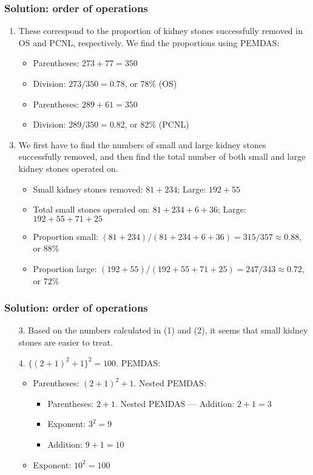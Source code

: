 \documentclass[11pt,dvipsnames]{beamer}
\newcommand{\myframe}[1]{\begin{frame} \frametitle{#1}}
\begin{document}
\myframe{Solution: order of operations}
\begin{enumerate}
\item These correspond to the proportion of kidney stones successfully removed in OS and PCNL, respectively. We find the proportions using PEMDAS:
\begin{itemize}
\item Parentheses: $273+77 = 350$
\item Division: $273/350 = 0.78$, or 78\% (OS)
\item Parentheses: $289+61 = 350$
\item Division: $289/350 = 0.82$, or 82\% (PCNL)
\end{itemize}
\item[]
\item We first have to find the numbers of small and large kidney stones successfully removed, and then find the total number of both small and large kidney stones operated on.
\begin{itemize}
\item Small kidney stones removed: $81+234$; Large: $192+55$
\item Total small stones operated on: $81+234+6+36$; Large: $192+55+71+25$
\item Proportion small: $(81+234)/(81+234+6+36) = 315/357 \approx 0.88$, or 88\%
\item Proportion large: $(192+55)/(192+55+71+25) = 247/343 \approx 0.72$, or 72\%
\end{itemize}
\end{enumerate}
\end{frame}

\myframe{Solution: order of operations}
\begin{enumerate}
\item[3.] Based on the numbers calculated in (1) and (2), it seems that small kidney stones are easier to treat.
\item[]
\item[4.] $\{(2+1)^2 + 1\}^2 = 100$. PEMDAS:
\begin{itemize}
\item Parentheses: $(2 + 1)^2 + 1$. Nested PEMDAS:
\begin{itemize}
\item Parentheses: $2 + 1$. Nested PEMDAS --- Addition: $2 + 1 = 3$
\item Exponent: $3^2 = 9$ 
\item Addition: $9 + 1 = 10$
\end{itemize}
\item Exponent: $10^2 = 100$
\end{itemize}
\end{enumerate}
\end{frame}
\end{document}
